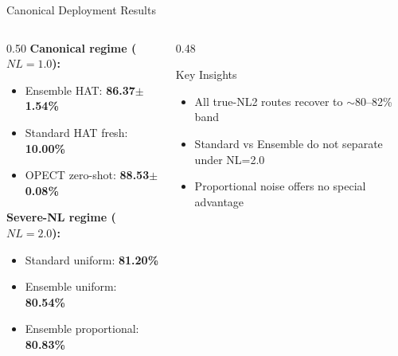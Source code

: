 \documentclass[aspectratio=169,11pt]{beamer}
\begin{document}
\begin{frame}{Canonical Deployment Results}
  \begin{columns}
    \begin{column}{0.50\textwidth}
      \textbf{Canonical regime ($NL=1.0$):}
      \begin{itemize}
        \item Ensemble HAT: \textbf{86.37$\pm$1.54\%}
        \item Standard HAT fresh: \textbf{10.00\%}
        \item OPECT zero-shot: \textbf{88.53$\pm$0.08\%}
      \end{itemize}
      \textbf{Severe-NL regime ($NL=2.0$):}
      \begin{itemize}
        \item Standard uniform: \textbf{81.20\%}
        \item Ensemble uniform: \textbf{80.54\%}
        \item Ensemble proportional: \textbf{80.83\%}
      \end{itemize}
    \end{column}
    \begin{column}{0.48\textwidth}
      \begin{block}{Key Insights}
        \begin{itemize}
          \item All true-NL2 routes recover to $\sim$80--82\% band
          \item Standard vs Ensemble do not separate under NL=2.0
          \item Proportional noise offers no special advantage
        \end{itemize}
      \end{block}
    \end{column}
  \end{columns}
\end{frame}
\end{document}
